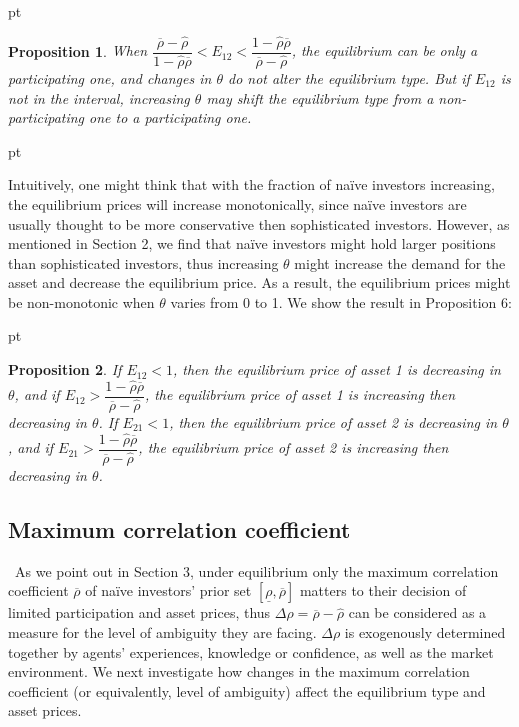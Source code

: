 \documentclass[10pt]{article}
\newtheorem{prop}{Proposition}
\begin{document}
 pt

\begin{prop}
When $ \dfrac{\overline{\rho} - {\hat \rho}}{1 - {\hat \rho} \overline{\rho}} < E_{1 2} < \dfrac{1 - {\hat \rho} \overline{\rho}}{\overline{\rho} - {\hat \rho}} $, the equilibrium can be only a participating one, and changes in $ \theta $ do not alter the equilibrium type. But if $ E_{1 2} $ is not in the interval, increasing $ \theta $ may shift the equilibrium type from a non-participating one to a participating one.
\end{prop}

 pt

Intuitively, one might think that with the fraction of na\"ive investors increasing, the equilibrium prices will increase monotonically, since na\"ive investors are usually thought to be more conservative then sophisticated investors. However, as mentioned in Section 2, we find that na\"ive investors might hold larger positions than sophisticated investors, thus increasing $ \theta $ might increase the demand for the asset and decrease the equilibrium price. As a result, the equilibrium prices might be non-monotonic when $ \theta $ varies from 0 to 1. We show the result in Proposition 6:

 pt

\begin{prop}
If $ E_{1 2} < 1 $, then the equilibrium price of asset 1 is decreasing in $ \theta $, and if $ E_{1 2} > \dfrac{1 - {\hat \rho} \overline{\rho}}{\overline{\rho} - {\hat \rho}} $, the equilibrium price of asset 1 is increasing then decreasing in $ \theta $. 
If $ E_{2 1} < 1 $, then the equilibrium price of asset 2 is decreasing in $ \theta $, and if $ E_{2 1} > \dfrac{1 - {\hat \rho} \overline{\rho}}{\overline{\rho} - {\hat \rho}} $, the equilibrium price of asset 2 is increasing then decreasing in $ \theta $. 
\end{prop}

\subsection{Maximum correlation coefficient}

\quad \ 
As we point out in Section 3, under equilibrium only the maximum correlation coefficient $ \overline{\rho} $ of na\"ive investors' prior set $ [\underline{\rho}, \overline{\rho}] $ matters to their decision of limited participation and asset prices, thus $ \Delta \rho = \overline{\rho} - \hat{\rho} $ can be considered as a measure for the level of ambiguity they are facing. $\Delta \rho $ is exogenously determined together by agents' experiences, knowledge or confidence, as well as the market environment. We next investigate how changes in the maximum correlation coefficient (or equivalently, level of ambiguity) affect the equilibrium type and asset prices. 
\end{document}
